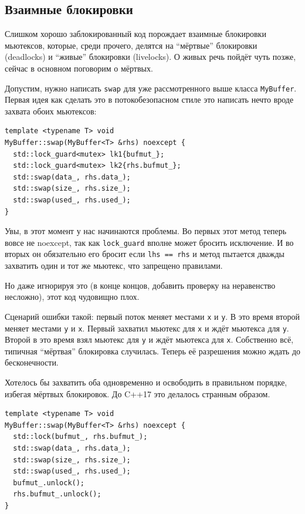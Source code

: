 \documentclass[a4paper,12pt,oneside]{book}
\begin{document}
\subsection{Взаимные блокировки}\label{sub:deadlock}

Слишком хорошо заблокированный код порождает взаимные блокировки мьютексов, которые, среди прочего, делятся на ``мёртвые'' блокировки (deadlocks) и ``живые'' блокировки (livelocks). О живых речь пойдёт чуть позже, сейчас в основном поговорим о мёртвых.

Допустим, нужно написать \lstinline!swap! для уже рассмотренного выше класса \lstinline!MyBuffer!. Первая идея как сделать это в потокобезопасном стиле это написать нечто вроде захвата обоих мьютексов:

\begin{lstlisting}
template <typename T> void 
MyBuffer::swap(MyBuffer<T> &rhs) noexcept {
  std::lock_guard<mutex> lk1{bufmut_};
  std::lock_guard<mutex> lk2{rhs.bufmut_};
  std::swap(data_, rhs.data_);
  std::swap(size_, rhs.size_);
  std::swap(used_, rhs.used_);
}
\end{lstlisting}

Увы, в этот момент у нас начинаются проблемы. Во первых этот метод теперь вовсе не noexcept, так как \lstinline!lock_guard! вполне может бросить исключение. И во вторых он обязательно его бросит если \lstinline!lhs == rhs! и метод пытается дважды захватить один и тот же мьютекс, что запрещено правилами.

Но даже игнорируя это (в конце концов, добавить проверку на неравенство несложно), этот код чудовищно плох.

Сценарий ошибки такой: первый поток меняет местами \lstinline!x! и \lstinline!y!. В это время второй меняет местами \lstinline!y! и \lstinline!x!. Первый захватил мьютекс для \lstinline!x! и ждёт мьютекса для \lstinline!y!. Второй в это время взял мьютекс для \lstinline!y! и ждёт мьютекса для \lstinline!x!. Собственно всё, типичная ``мёртвая'' блокировка случилась. Теперь её разрешения можно ждать до бесконечности.

Хотелось бы захватить оба одновременно и освободить в правильном порядке, избегая мёртвых блокировок. До C++17 это делалось странным образом.

\begin{lstlisting}
template <typename T> void 
MyBuffer::swap(MyBuffer<T> &rhs) noexcept {
  std::lock(bufmut_, rhs.bufmut_);
  std::swap(data_, rhs.data_);
  std::swap(size_, rhs.size_);
  std::swap(used_, rhs.used_);
  bufmut_.unlock();
  rhs.bufmut_.unlock();
}
\end{lstlisting}
\end{document}
